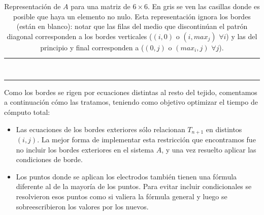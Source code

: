 \documentclass[a4paper]{article}
\begin{document}
\begin{table}[!htbp]
\begin{tabular}{|l|l|l|l|l|l|l|l|l|l|l|l|l|l|l|l|l|l|l|l|l|l|l|l|l|l|l|l|l|l|l|l|l|l|l|l|}
 & & & & & & & & & & & & & & & & & & & & & \cellcolor{mygray} & & & & & \cellcolor{mygray} & \cellcolor{mygray} & \cellcolor{mygray} & & & & & \cellcolor{mygray} & & \\ \hline 
 & & & & & & & & & & & & & & & & & & & & & & \cellcolor{mygray} & & & & & \cellcolor{mygray} & \cellcolor{mygray} & \cellcolor{mygray} & & & & & \cellcolor{mygray} & \\ \hline 
 & & & & & & & & & & & & & & & & & & & & & & & & & & & & & & & & & & & \\ \hline 
 & & & & & & & & & & & & & & & & & & & & & & & & & & & & & & & & & & & \\ \hline 
 & & & & & & & & & & & & & & & & & & & & & & & & & & & & & & & & & & & \\ \hline 
 & & & & & & & & & & & & & & & & & & & & & & & & & & & & & & & & & & & \\ \hline 
 & & & & & & & & & & & & & & & & & & & & & & & & & & & & & & & & & & & \\ \hline 
 & & & & & & & & & & & & & & & & & & & & & & & & & & & & & & & & & & & \\ \hline 
 & & & & & & & & & & & & & & & & & & & & & & & & & & & & & & & & & & & \\ \hline
\end{tabular}
\caption{Representación de $A$ para una matriz de $6\times6$. En gris se ven las casillas donde es posible que haya un elemento no nulo. Esta representación ignora los bordes (están en blanco): notar que las filas del medio que discontinúan el patrón diagonal corresponden a los bordes verticales ($(i,0)$ o $(i,max_j)$ $\forall i$) y las del principio y final corresponden a ($(0,j)$ o $(max_i,j)$ $\forall j$). }
\label{table:matriz_a}
\end{table}

Como los bordes se rigen por ecuaciones distintas al resto del tejido, comentamos a continuación
cómo las tratamos, teniendo como objetivo optimizar el tiempo de cómputo total:
\begin{itemize}
\item Las ecuaciones de los bordes exteriores sólo
relacionan $T_{n+1}$ en distintos $(i,j)$. La mejor forma de implementar esta
restricción que encontramos fue no incluir los bordes exteriores en el sistema $A$, y una vez
resuelto aplicar las condiciones de borde.
\item Los puntos donde se aplican los electrodos también tienen una 
fórmula diferente al de la mayoría de los puntos. Para evitar incluir 
condicionales se resolvieron esos puntos como si valiera la fórmula general
y luego se sobreescribieron los valores por los nuevos.
\end{itemize}
\end{document}
